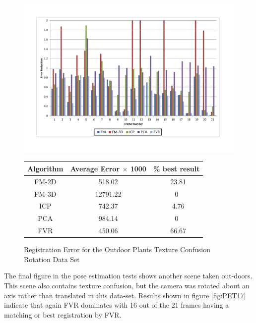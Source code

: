 \begin{figure}
\centering
\includegraphics[width=6in]{images/results/Plants_Outdoors_Texture_Confusion_Rotation}
\caption{Registration Error for the Outdoor Plants Texture Confusion Rotation Data Set}
\label{fig:PET17}

\begin{tabular}{ccc}
\hline
\textbf{Algorithm} & \textbf{Average Error $\times$ 1000} & \textbf{\% best result}\\ \hline
FM-2D	& 518.02 & ~23.81\\
FM-3D	& 12791.22 & 0\\
ICP		& 742.37 & ~4.76\\
PCA		& 984.14 & 0\\
FVR		& 450.06 & ~66.67\\
\end{tabular}
\label{tab:PET17ST}
\end{figure}


The final figure in the pose estimation tests shows another scene taken out-doors. This scene also contains texture confusion, but the camera was rotated about an axis rather than translated in this data-set. Results shown in figure \ref{fig:PET17} indicate that again FVR dominates with 16 out of the 21 frames having a matching or best registration by FVR. 
